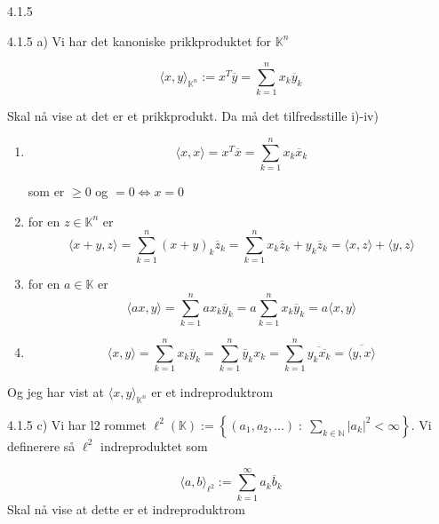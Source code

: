 \documentclass[a4paper,norsk]{article}
\renewcommand{\geq}{\geqslant}
\begin{document}
\begin{oppgavebox}{4.1.5}{}

\begin{proofbox}{4.1.5 a)}{}
    Vi har det kanoniske prikkproduktet for $ \mathbb{K}^n $ 

    \[
        \langle x, y \rangle _{\mathbb{K}^n} := x^T \overline{y} = \sum_{ k=1 }^{ n } x_k \overline{y}_k
    \]

    Skal nå vise at det er et prikkprodukt. Da må det tilfredsstille i)-iv)

    \begin{enumerate}
        \item \[
            \langle x, x \rangle = x^T \overline{x} = \sum_{ k=1 }^{ n } x_k \overline{x}_k  
        \]
         
        som er $ \geq 0 $ og $ =0 \Longleftrightarrow x=0$  
        \item for en $ z \in \mathbb{K}^n $ er  \[
            \langle x+y, z \rangle = \sum_{ k=1 }^{ n } (x+y)_k \overline{z}_k 
            = \sum_{ k=1 }^{ n } x_k \overline{z}_k + y_k \overline{z}_k 
            = \langle x, z \rangle + \langle y, z \rangle 
        \]
        

        \item for en $ a \in \mathbb{K} $ er \[
            \langle ax, y \rangle = \sum_{ k=1 }^{ n } ax_k \overline{y}_k 
            = a \sum_{ k=1 }^{ n } x_k \overline{y}_k 
            = a \langle x, y \rangle 
        \]
        

        \item \[
            \langle x, y \rangle = \sum_{ k=1 }^{ n } x_k \overline{y}_k 
            = \sum_{ k=1 }^{ n } \overline{y}_k x_k
            = \sum_{ k=1 }^{ n } \overline{ y_k \overline{x_k}}
            = \overline{\langle y, x \rangle}  
        \]
    \end{enumerate}
    Og jeg har vist at $ \langle x, y \rangle _{\mathbb{K}^n} $ er et indreproduktrom 
\end{proofbox}

\begin{proofbox}{4.1.5 c)}{}
    Vi har l2 rommet $\ell^2(\mathbb{K}) := 
    \left\{ (a_1, a_2, \ldots) \; : \; 
    \sum_{k \in \mathbb{N}} |a_k|^2 < \infty 
    \right\}$. Vi definerere så $ \ell^2 $ indreproduktet som 

    \[
        \langle a, b \rangle _{\ell^2} := \sum_{ k=1 }^{ \infty } a_k \overline{b}_k
    \]
    Skal nå vise at dette er et indreproduktrom


\end{proofbox}
\end{oppgavebox}
\end{document}
